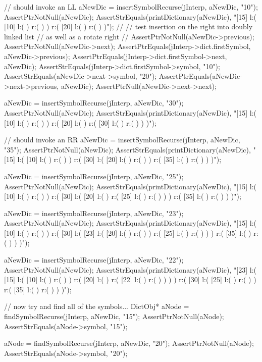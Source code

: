   // should invoke an LL
  aNewDic = insertSymbolRecurse(jInterp, aNewDic, "10");
  AssertPtrNotNull(aNewDic);
  AssertStrEquals(printDictionary(aNewDic),
  "[15] l:( [10] l:(  ) r:(  )  ) r:( [20] l:(  ) r:(  )  )");
  //
  // test insertion on the right into doubly linked list
  // as well as a rotate right
  //
  AssertPtrNotNull(aNewDic->previous);
  AssertPtrNotNull(aNewDic->next);
  AssertPtrEquals(jInterp->dict.firstSymbol, aNewDic->previous);
  AssertPtrEquals(jInterp->dict.firstSymbol->next, aNewDic);
  AssertStrEquals(jInterp->dict.firstSymbol->symbol, "10");
  AssertStrEquals(aNewDic->next->symbol, "20");
  AssertPtrEquals(aNewDic->next->previous, aNewDic);
  AssertPtrNull(aNewDic->next->next);

  aNewDic = insertSymbolRecurse(jInterp, aNewDic, "30");
  AssertPtrNotNull(aNewDic);
  AssertStrEquals(printDictionary(aNewDic),
  "[15] l:( [10] l:(  ) r:(  )  ) r:( [20] l:(  ) r:( [30] l:(  ) r:(  )  )  )");

  // should invoke an RR
  aNewDic = insertSymbolRecurse(jInterp, aNewDic, "35");
  AssertPtrNotNull(aNewDic);
  AssertStrEquals(printDictionary(aNewDic),
  "[15] l:( [10] l:(  ) r:(  )  ) r:( [30] l:( [20] l:(  ) r:(  )  ) r:( [35] l:(  ) r:(  )  )  )");

  aNewDic = insertSymbolRecurse(jInterp, aNewDic, "25");
  AssertPtrNotNull(aNewDic);
  AssertStrEquals(printDictionary(aNewDic),
  "[15] l:( [10] l:(  ) r:(  )  ) r:( [30] l:( [20] l:(  ) r:( [25] l:(  ) r:(  )  )  ) r:( [35] l:(  ) r:(  )  )  )");

  aNewDic = insertSymbolRecurse(jInterp, aNewDic, "23");
  AssertPtrNotNull(aNewDic);
  AssertStrEquals(printDictionary(aNewDic),
  "[15] l:( [10] l:(  ) r:(  )  ) r:( [30] l:( [23] l:( [20] l:(  ) r:(  )  ) r:( [25] l:(  ) r:(  )  )  ) r:( [35] l:(  ) r:(  )  )  )");

  aNewDic = insertSymbolRecurse(jInterp, aNewDic, "22");
  AssertPtrNotNull(aNewDic);
  AssertStrEquals(printDictionary(aNewDic),
  "[23] l:( [15] l:( [10] l:(  ) r:(  )  ) r:( [20] l:(  ) r:( [22] l:(  ) r:(  )  )  )  ) r:( [30] l:( [25] l:(  ) r:(  )  ) r:( [35] l:(  ) r:(  )  )  )");

  // now try and find all of the symbols...
  DictObj* aNode = findSymbolRecurse(jInterp, aNewDic, "15");
  AssertPtrNotNull(aNode);
  AssertStrEquals(aNode->symbol, "15");

  aNode = findSymbolRecurse(jInterp, aNewDic, "20");
  AssertPtrNotNull(aNode);
  AssertStrEquals(aNode->symbol, "20");

